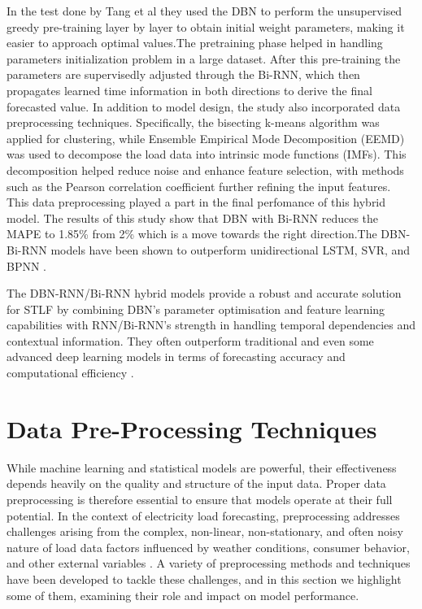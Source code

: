  
 In the test done by Tang et al \cite{tang2019application} they used the DBN to perform the unsupervised greedy pre-training layer by layer to obtain initial weight parameters, making it easier to approach optimal values.The pretraining phase helped in handling parameters initialization problem in a large dataset. After this pre-training the parameters are supervisedly adjusted through the Bi-RNN, which then propagates learned time information in both directions to derive the final forecasted value. 
 In addition to model design, the study also incorporated data preprocessing techniques. Specifically, the bisecting k-means algorithm was applied for clustering, while Ensemble Empirical Mode Decomposition (EEMD) was used to decompose the load data into intrinsic mode functions (IMFs). This decomposition helped reduce noise and enhance feature selection, with methods such as the Pearson correlation coefficient further refining the input features. This data preprocessing played a part in the final perfomance of this hybrid model.
 The results of this study show that DBN with Bi-RNN reduces the MAPE to 1.85\% from 2\% which is a move towards the right direction.The  DBN-Bi-RNN models have been shown to outperform unidirectional LSTM, SVR, and BPNN \cite{tang2019application}.
 
 The DBN-RNN/Bi-RNN hybrid models provide a robust and accurate solution for STLF by combining DBN's parameter optimisation and feature learning capabilities with RNN/Bi-RNN's strength in handling temporal dependencies and contextual information. They often outperform traditional and even some advanced deep learning models in terms of forecasting accuracy and computational efficiency \cite{dong2021short}.
 
 
 
 \section{Data Pre-Processing Techniques}
 
 While machine learning and statistical models are powerful, their effectiveness depends heavily on the quality and structure of the input data. Proper data preprocessing is therefore essential to ensure that models operate at their full potential. In the context of electricity load forecasting, preprocessing addresses challenges arising from the complex, non-linear, non-stationary, and often noisy nature of load data factors influenced by weather conditions, consumer behavior, and other external variables \cite{revathi2025short}. A variety of preprocessing methods and techniques have been developed to tackle these challenges, and in this section we highlight some of them, examining their role and impact on model performance.
 
